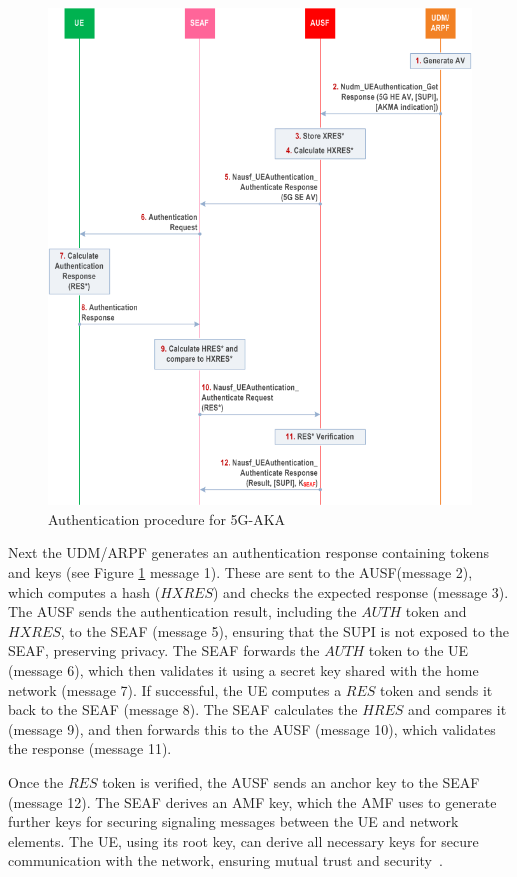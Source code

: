 \begin{figure}
    \centering
    \includegraphics[width=0.75\linewidth]{figs/Authentication procedure for 5G AKA.png}
    \caption{Authentication procedure for \ac{5G-AKA}}
    \label{fig:Authentication procedure for 5G AKA}
\end{figure}

Next the \ac{UDM}/\ac{ARPF} generates an authentication response containing tokens and keys (see Figure \ref{fig:Authentication procedure for 5G AKA} message 1). These are sent to the \ac{AUSF}(message 2), which computes a hash ($HXRES$) and checks the expected response (message 3). The \ac{AUSF} sends the authentication result, including the $AUTH$ token and $HXRES$, to the \ac{SEAF} (message 5), ensuring that the \ac{SUPI} is not exposed to the \ac{SEAF}, preserving privacy. The \ac{SEAF} forwards the $AUTH$ token to the \ac{UE} (message 6), which then validates it using a secret key shared with the home network (message 7). If successful, the \ac{UE} computes a $RES$ token and sends it back to the \ac{SEAF} (message 8). The \ac{SEAF} calculates the $HRES$ and compares it (message 9), and then forwards this to the \ac{AUSF} (message 10), which validates the response (message 11).

Once the $RES$ token is verified, the \ac{AUSF} sends an anchor key to the \ac{SEAF} (message 12). The \ac{SEAF} derives an \acs{AMF} key, which the \acl{AMF} uses to generate further keys for securing signaling messages between the \ac{UE} and network elements. The \ac{UE}, using its root key, can derive all necessary keys for secure communication with the network, ensuring mutual trust and security~\cite{33.501-p52}.

